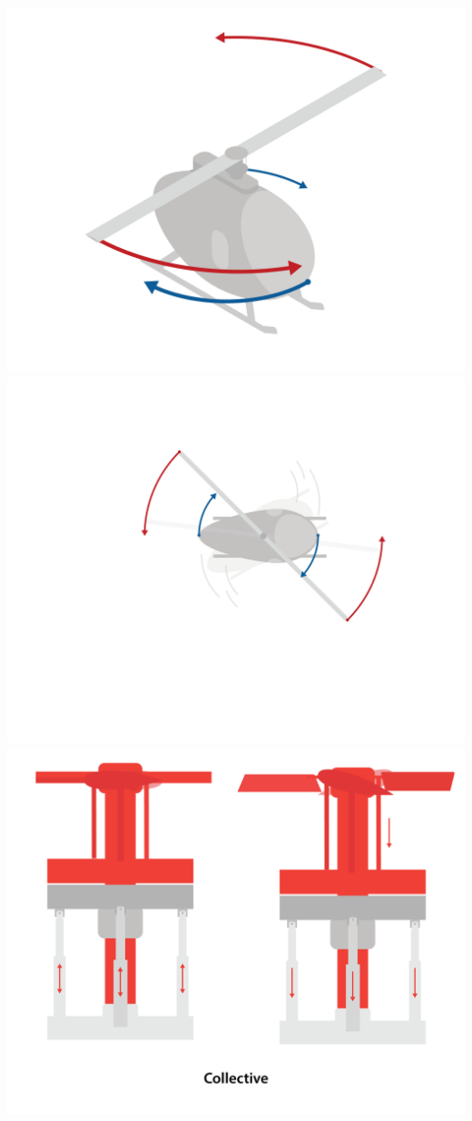 \includegraphics[width=.75\textwidth]{tailless2.png}
\includegraphics[width=.75\textwidth]{tailless1.png}
\includegraphics[width=.75\textwidth]{collectiveQuad.png}
